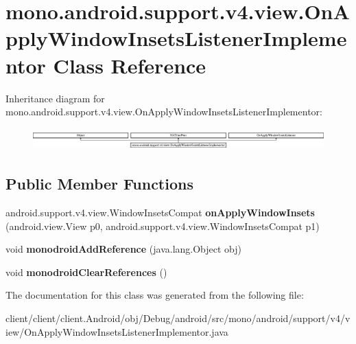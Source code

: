 \hypertarget{classmono_1_1android_1_1support_1_1v4_1_1view_1_1OnApplyWindowInsetsListenerImplementor}{}\section{mono.\+android.\+support.\+v4.\+view.\+On\+Apply\+Window\+Insets\+Listener\+Implementor Class Reference}
\label{classmono_1_1android_1_1support_1_1v4_1_1view_1_1OnApplyWindowInsetsListenerImplementor}
Inheritance diagram for mono.\+android.\+support.\+v4.\+view.\+On\+Apply\+Window\+Insets\+Listener\+Implementor\+:\begin{figure}[H]
\begin{center}
\leavevmode
\includegraphics[height=0.862202cm]{classmono_1_1android_1_1support_1_1v4_1_1view_1_1OnApplyWindowInsetsListenerImplementor}
\end{center}
\end{figure}
\subsection*{Public Member Functions}
\begin{DoxyCompactItemize}
\item 
\hypertarget{classmono_1_1android_1_1support_1_1v4_1_1view_1_1OnApplyWindowInsetsListenerImplementor_a2230411e95dcf2d47b86e1b35d2e91ee}{}android.\+support.\+v4.\+view.\+Window\+Insets\+Compat {\bfseries on\+Apply\+Window\+Insets} (android.\+view.\+View p0, android.\+support.\+v4.\+view.\+Window\+Insets\+Compat p1)\label{classmono_1_1android_1_1support_1_1v4_1_1view_1_1OnApplyWindowInsetsListenerImplementor_a2230411e95dcf2d47b86e1b35d2e91ee}

\item 
\hypertarget{classmono_1_1android_1_1support_1_1v4_1_1view_1_1OnApplyWindowInsetsListenerImplementor_a1cc958285db59d60fb6eac2b1f8295ec}{}void {\bfseries monodroid\+Add\+Reference} (java.\+lang.\+Object obj)\label{classmono_1_1android_1_1support_1_1v4_1_1view_1_1OnApplyWindowInsetsListenerImplementor_a1cc958285db59d60fb6eac2b1f8295ec}

\item 
\hypertarget{classmono_1_1android_1_1support_1_1v4_1_1view_1_1OnApplyWindowInsetsListenerImplementor_ac798280f8de141aa346f20a7cee58899}{}void {\bfseries monodroid\+Clear\+References} ()\label{classmono_1_1android_1_1support_1_1v4_1_1view_1_1OnApplyWindowInsetsListenerImplementor_ac798280f8de141aa346f20a7cee58899}

\end{DoxyCompactItemize}


The documentation for this class was generated from the following file\+:\begin{DoxyCompactItemize}
\item 
client/client/client.\+Android/obj/\+Debug/android/src/mono/android/support/v4/view/On\+Apply\+Window\+Insets\+Listener\+Implementor.\+java\end{DoxyCompactItemize}
